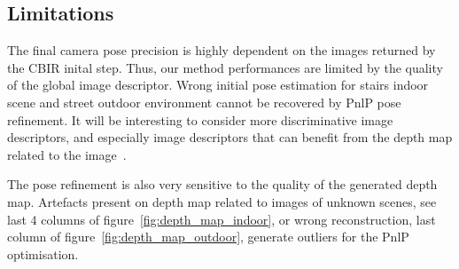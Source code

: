\subsection{Limitations}
The final camera pose precision is highly dependent on the images returned by the CBIR inital step. Thus, our method performances are limited by the quality of the global image descriptor. Wrong initial pose estimation for stairs indoor scene and street outdoor environment cannot be recovered by PnlP pose refinement. It will be interesting to consider more discriminative image descriptors, and especially image descriptors that can benefit from the depth map related to the image~\citep{Piasco2019}.

The pose refinement is also very sensitive to the quality of the generated depth map. Artefacts present on depth map related to images of unknown scenes, see last 4 columns of figure~\ref{fig:depth_map_indoor}, or wrong reconstruction, last column of figure~\ref{fig:depth_map_outdoor}, generate outliers for the PnlP optimisation.

